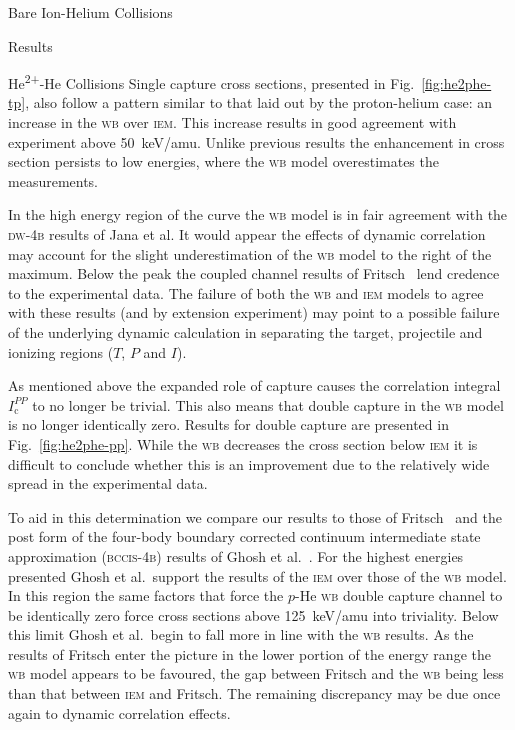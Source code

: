 \documentclass[letterpaper, 11 pt]{report}
\begin{document}
\begin{chapter}{Bare Ion-Helium Collisions \label{chap:p-he2p-he}}
\begin{section}{Results \label{sec:phe2p-res}}
\begin{subsection}{\texorpdfstring{He\textsuperscript{2+}}{He2+}-He Collisions
                         \label{sec:he2phe-res}}
         Single capture cross sections, presented in Fig.~\ref{fig:he2phe-tp}, also follow a pattern
         similar to that laid out by the proton-helium case: an increase in the \textsc{wb} over
         \textsc{iem}. This increase results in good agreement with experiment above 50~keV/amu. Unlike
         previous results the enhancement in cross section persists to low energies, where the
         \textsc{wb} model overestimates the measurements.

         In the high energy region of the curve the \textsc{wb} model is in fair agreement with the
         \textsc{dw-4b} results of Jana et al. It would appear the effects of dynamic correlation may
         account for the slight underestimation of the \textsc{wb} model to the right of the maximum.
         Below the peak the coupled channel results of Fritsch~\cite{Fritsch-94} lend credence to the
         experimental data. The failure of both the \textsc{wb} and \textsc{iem} models to agree with
         these results (and by extension experiment) may point to a possible failure of the underlying
         dynamic calculation in separating the target, projectile and ionizing regions ($T$, $P$ and
         $I$).

         As mentioned above the expanded role of capture causes the correlation integral
         $I^{PP}_\mathrm{c}$ to no longer be trivial. This also means that double capture in the
         \textsc{wb} model is no longer identically zero. Results for double capture are presented in
         Fig.~\ref{fig:he2phe-pp}. While the \textsc{wb} decreases the cross section below \textsc{iem}
         it is difficult to conclude whether this is an improvement due to the relatively wide spread in
         the experimental data.

         To aid in this determination we compare our results to those of Fritsch~\cite{Fritsch-94} and
         the post form of the four-body boundary corrected continuum intermediate state approximation
         (\textsc{bccis-4b}) results of Ghosh et al.~\cite{GDMP-08}. For the highest energies presented
         Ghosh et al.\ support the results of the \textsc{iem} over those of the \textsc{wb} model. In
         this region the same factors that force the $p$-He \textsc{wb} double capture channel to be
         identically zero force cross sections above 125~keV/amu into triviality. Below this limit Ghosh
         et al.\ begin to fall more in line with the \textsc{wb} results. As the results of Fritsch
         enter the picture in the lower portion of the energy range the \textsc{wb} model appears to be
         favoured, the gap between Fritsch and the \textsc{wb} being less than that between \textsc{iem}
         and Fritsch. The remaining discrepancy may be due once again to dynamic correlation effects.


\end{subsection}
\end{section}
\end{chapter}
\end{document}

